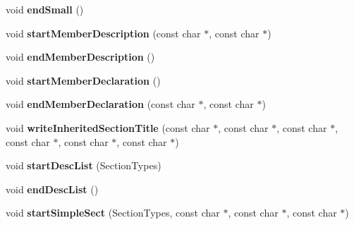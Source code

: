 \begin{DoxyCompactItemize}
\item 
\hypertarget{class_man_generator_afd1e7cfc27d1c1aa0638c9c4f94ee469}{void {\bfseries end\-Small} ()}\label{class_man_generator_afd1e7cfc27d1c1aa0638c9c4f94ee469}

\item 
\hypertarget{class_man_generator_abc55523ac9a74887fb868ad11d0956a0}{void {\bfseries start\-Member\-Description} (const char $\ast$, const char $\ast$)}\label{class_man_generator_abc55523ac9a74887fb868ad11d0956a0}

\item 
\hypertarget{class_man_generator_a0dd91ddf8c2ef96803ec72c46964fdfd}{void {\bfseries end\-Member\-Description} ()}\label{class_man_generator_a0dd91ddf8c2ef96803ec72c46964fdfd}

\item 
\hypertarget{class_man_generator_adc7e1ef5ab7013afb090683808aec804}{void {\bfseries start\-Member\-Declaration} ()}\label{class_man_generator_adc7e1ef5ab7013afb090683808aec804}

\item 
\hypertarget{class_man_generator_a72e9196e0361b6a7c0388f61047141dc}{void {\bfseries end\-Member\-Declaration} (const char $\ast$, const char $\ast$)}\label{class_man_generator_a72e9196e0361b6a7c0388f61047141dc}

\item 
\hypertarget{class_man_generator_a78c22cc38dae09d7200a1f4d3b9a3e50}{void {\bfseries write\-Inherited\-Section\-Title} (const char $\ast$, const char $\ast$, const char $\ast$, const char $\ast$, const char $\ast$, const char $\ast$)}\label{class_man_generator_a78c22cc38dae09d7200a1f4d3b9a3e50}

\item 
\hypertarget{class_man_generator_a9c0bb2efe62ee473e0751b8db35e847a}{void {\bfseries start\-Desc\-List} (Section\-Types)}\label{class_man_generator_a9c0bb2efe62ee473e0751b8db35e847a}

\item 
\hypertarget{class_man_generator_ab6e97c139518cd722a4da899d4bcf366}{void {\bfseries end\-Desc\-List} ()}\label{class_man_generator_ab6e97c139518cd722a4da899d4bcf366}

\item 
\hypertarget{class_man_generator_af78a3d7bf076c8f5e6bb859460a3437d}{void {\bfseries start\-Simple\-Sect} (Section\-Types, const char $\ast$, const char $\ast$, const char $\ast$)}\label{class_man_generator_af78a3d7bf076c8f5e6bb859460a3437d}


\end{DoxyCompactItemize}
